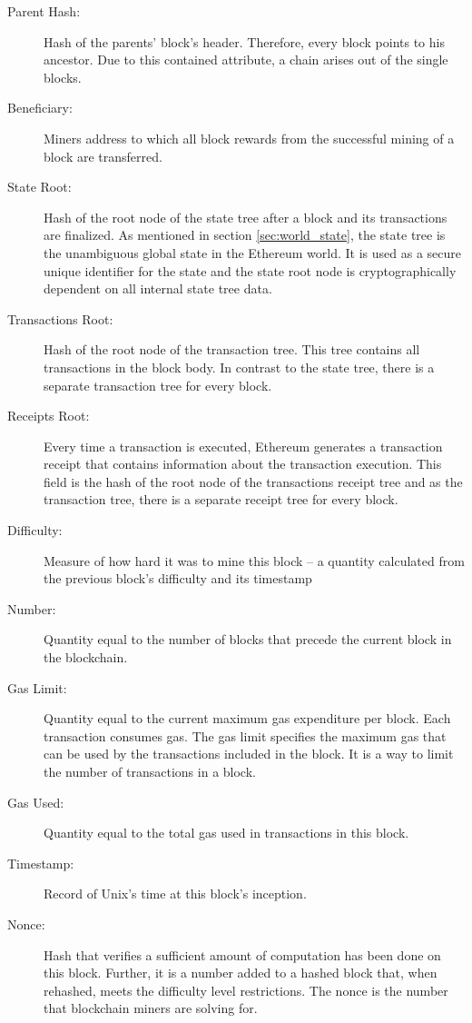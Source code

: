 \begin{description}
	\item[Parent Hash:] Hash of the parents' block's header. Therefore, every block points to his ancestor. Due to this contained attribute, a chain arises out of the single blocks.
	\item[Beneficiary:] Miners address to which all block rewards from the successful mining of a block are transferred.
	\item[State Root:] Hash of the root node of the state tree after a block and its transactions are finalized. As mentioned in section 
	\ref{sec:world_state}, the state tree is the unambiguous global state in the Ethereum world. It is used as a secure unique identifier for the state and the state root node is cryptographically dependent on all internal state tree data.
	\item[Transactions Root:] Hash of the root node of the transaction tree. This tree contains all transactions in the block body. In contrast to the state tree, there is a separate transaction tree for every block. 
	\item[Receipts Root:] Every time a transaction is executed, Ethereum generates a transaction receipt that contains information about the transaction execution. This field is the hash of the root node of the transactions receipt tree and as the transaction tree, there is a separate receipt tree for every block.
	\item[Difficulty:] Measure of how hard it was to mine this block – a quantity calculated from the previous block’s difficulty and its timestamp
	\item[Number:] Quantity equal to the number of blocks that precede the current block in the blockchain.
	\item[Gas Limit:] Quantity equal to the current maximum gas expenditure per block. Each transaction consumes gas. The gas limit specifies the maximum gas that can be used by the transactions included in the block. It is a way to limit the number of transactions in a block.
	\item[Gas Used:] Quantity equal to the total gas used in transactions in this block.
	\item[Timestamp:] Record of Unix’s time at this block’s inception.
	\item[Nonce:] Hash that verifies a sufficient amount of computation has been done on this block. Further, it is a number added to a hashed block that, when rehashed, meets the difficulty level restrictions. The nonce is the number that blockchain miners are solving for.
\end{description}

